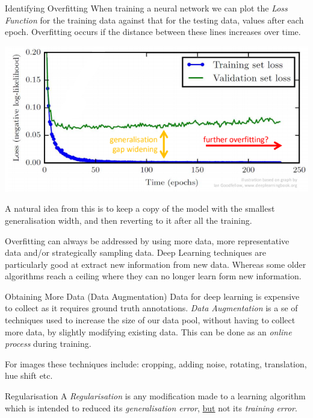 \documentclass[11pt,a4paper]{article}
\begin{document}
\begin{proposition}{Identifying Overfitting}
  When training a neural network we can plot the \textit{Loss Function} for the training data against that for the testing data, values after each epoch. Overfitting occurs if the distance between these lines increases over time.
  \begin{center}
    \includegraphics[width=.7\textwidth]{overfitting.PNG}
  \end{center}
  A natural idea from this is to keep a copy of the model with the smallest generalisation width, and then reverting to it after all the training.
\end{proposition}

\begin{remark}{Overfitting can always be addressed by using more data, more representative data and/or strategically sampling data.}
  Deep Learning techniques are particularly good at extract new information from new data. Whereas some older algorithms reach a ceiling where they can no longer learn form new information.
\end{remark}

\begin{proposition}{Obtaining More Data (Data Augmentation)}
  Data for deep learning is expensive to collect as it requires ground truth annotations. \textit{Data Augmentation} is a se of techniques used to increase the size of our data pool, without having to collect more data, by slightly modifying existing data. This can be done as an \textit{online process} during training.
  \par For images these techniques include: cropping, adding noise, rotating, translation, hue shift etc.
\end{proposition}

\begin{definition}{Regularisation}
  A \textit{Regularisation} is any modification made to a learning algorithm which is intended to reduced its \textit{generalisation error}, \underline{but} not its \textit{training error}.
\end{definition}
\end{document}
